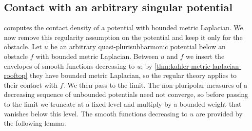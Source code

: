 \subsection{Contact with an arbitrary singular potential}
\label{sec:irregular-potential-contact}
 computes the contact density of a potential with bounded metric Laplacian. We now remove this regularity assumption on the potential and keep it only for the obstacle. Let $u$ be an arbitrary quasi-plurisubharmonic potential below an obstacle $f$ with bounded metric Laplacian. Between $u$ and $f$ we insert the envelopes of smooth functions decreasing to $u$; by \cref{thm:kahler-metric-laplacian-rooftop} they have bounded metric Laplacian, so the regular theory applies to their contact with $f$. We then pass to the limit. The non-pluripolar measures of a decreasing sequence of unbounded potentials need not converge, so before passing to the limit we truncate at a fixed level and multiply by a bounded weight that vanishes below this level. The smooth functions decreasing to $u$ are provided by the following lemma.

